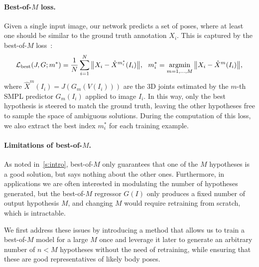 \paragraph{Best-of-$M$ loss.}
Given a single input image, our network predicts a set of poses, where at least one should be similar to the ground truth annotation $X_i$.
This is captured by the best-of-$M$ loss~\cite{guzman2012multiple}:
\begin{equation}\label{e:loss-best}
  \mathcal{L}_\text{best}(J,G;m^*)
  =
  \frac{1}{N}
  \sum_{i=1}^N
  \big \| X_i - \hat X^{m_i^*}(I_i) \big \|,
  ~~
  m_i^*
  =
  \operatornamewithlimits{argmin}_{m=1,\dots,M}
  \big \| X_i -  \hat X^{m}(I_i) \big \|,
\end{equation}
where $\hat X^{m}(I_i) = J(G_m(V(I_i)))$ are the 3D joints estimated by the $m$-th SMPL predictor $G_m(I_i)$ applied to image $I_i$.
In this way, only the best hypothesis is steered to match the ground truth, leaving the other hypotheses free to sample the space of ambiguous solutions.
During the computation of this loss, we also extract the best index $m^*_i$ for each training example.

\paragraph{Limitations of best-of-$M$.}

As noted in~\cref{s:intro}, best-of-$M$ only guarantees that one of the $M$ hypotheses is a good solution, but says nothing about the other ones.
Furthermore, in applications we are often interested in modulating the number of hypotheses generated, but the best-of-$M$ regressor $G(I)$ only produces a fixed number of output hypothesis $M$, and changing $M$ would require retraining from scratch, which is intractable.

We first address these issues by introducing a method that allows us to train a best-of-$M$ model for a large $M$ once and leverage it later to generate an arbitrary number of $n < M$ hypotheses without the need of retraining, while ensuring that these are good representatives of likely body poses.

